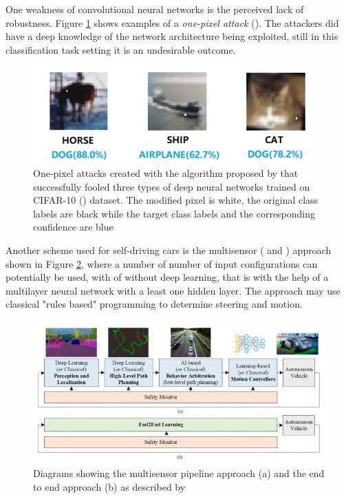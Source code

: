 One weakness of convolutional neural networks is the perceived lack of robustness. Figure \ref{fig:one-pixel-attack} shows examples of a \textit{one-pixel attack} (\cite{Su_2019}). The attackers did have a deep knowledge of the network architecture being exploited, still in this classification task setting it is an undesirable outcome.


\begin{figure}[ht]
 \centering 
 \includegraphics[scale=1]{Figures/one-pixel-attack.png}
 \caption{One-pixel  attacks  created  with the algorithm proposed by \cite{Su_2019} that  successfully  fooled  three  types  of deep neural networks trained  on  CIFAR-10 (\cite{CIFAR_10}) dataset. The modified pixel is white, the original  class  labels  are   black while  the  target  class  labels  and  the corresponding confidence are blue}
 \label{fig:one-pixel-attack}
\end{figure}

Another scheme used for self-driving cars is the multisensor (\cite{Grigorescu_2020} and \cite{Yurtsever_2020}) approach shown in Figure \ref{fig:grigorescu-pipeline}, where a number of number of input configurations can potentially be used, with of without deep learning, that is with the help of a multilayer neural network with a least one hidden layer. The approach may use classical "rules based" programming to determine steering and motion.

\begin{figure}[ht]
 \centering 
 \includegraphics[scale=0.85]{Figures/grigorescu-pipeline.png}
 \caption{Diagrams showing the multisensor pipeline approach (a) and the end to end approach (b) as described by \cite{Grigorescu_2020}}
 \label{fig:grigorescu-pipeline}
\end{figure}



